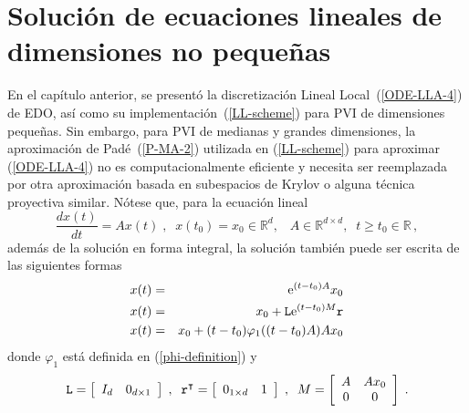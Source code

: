 \chapter{Solución de ecuaciones lineales de dimensiones no pequeñas}\label{chapter:solve-non-smal-lineal-eq}

En el capítulo anterior, se presentó la discretización Lineal Local~(\ref{ODE-LLA-4}) de EDO, así como su implementación~(\ref{LL-scheme}) para PVI de dimensiones pequeñas. Sin embargo, para PVI de medianas y grandes dimensiones, la aproximación de Padé~(\ref{P-MA-2}) utilizada en (\ref{LL-scheme}) para aproximar (\ref{ODE-LLA-4}) no es computacionalmente eficiente y necesita ser reemplazada por otra aproximación basada en subespacios de Krylov o alguna técnica proyectiva similar. Nótese que, para la ecuación lineal
\begin{equation*}
	\frac{dx(t)}{dt}=Ax(t)\;,\;\; x(t_0)=x_0\in\mathbb{R}^{d},\;\;\; A\in\mathbb{R}^{d\times d},\;\;t\geq t_0\in\mathbb{R} \,,
\end{equation*}
además de la solución en forma integral, la solución también puede ser escrita de las siguientes formas
\begin{eqnarray}
	x(t) & = & \mathrm{e}^{(t-t_0)A}x_0 \label{eqaux:lineal-solution-ex} \\
	x(t) & = & x_0 + \mathtt{L}\mathrm{e}^{(t-t_0)M}\mathtt{r} \label{eqaux:lineal-solution-xex} \\
	x(t) & = & x_0 + (t-t_0)\varphi_1((t-t_0)A)Ax_0 \label{eqaux:lineal-solution-xphix}
\end{eqnarray}
donde $\varphi_1$ está definida en (\ref{phi-definition}) y
\begin{equation*}
	\mathtt{L}=\left[ \begin{array}{ll} I_{d} & 0_{d\times 1}\end{array} \right] \;,\;\;
	\mathtt{r}^{\intercal }=\left[ \begin{array}{ll} 0_{1\times d} & 1\end{array}\right] \;,\;\;
	M=\left[
	\begin{array}{cc}
	A & Ax_0 \\
	0 & 0
	\end{array}
	\right]\;.
\end{equation*}
